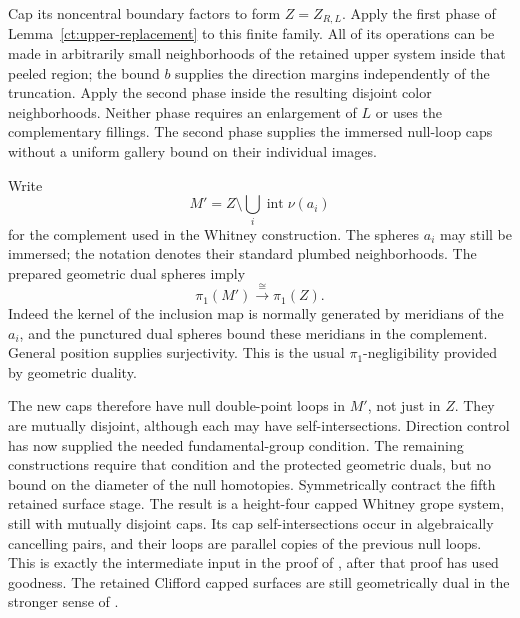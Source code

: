 Cap its noncentral boundary factors to form $Z=Z_{R,L}$. Apply the
first phase of
Lemma~\ref{ct:upper-replacement} to this finite family. All of its
operations can be made in arbitrarily small neighborhoods of the
retained upper system inside that peeled region; the bound $b$ supplies
the direction
margins independently of the truncation. Apply the second phase inside
the resulting disjoint color neighborhoods. Neither phase requires
an enlargement of $L$ or uses the complementary fillings. The second
phase supplies the immersed null-loop caps without a uniform gallery
bound on their individual images.

Write
\[
                  M'=Z\setminus\bigcup_i\operatorname{int}\nu(a_i)
\]
for the complement used in the Whitney construction.  The spheres
$a_i$ may still be immersed; the notation denotes their standard
plumbed neighborhoods.  The prepared geometric dual spheres imply
\begin{equation}\label{ct:complement-group}
                   \pi_1(M')\xrightarrow{\ \cong\ }\pi_1(Z).
\end{equation}
Indeed the kernel of the inclusion map is normally generated by
meridians of the $a_i$, and the punctured dual spheres bound these
meridians in the complement.  General position supplies surjectivity.
This is the usual $\pi_1$-negligibility provided by geometric duality.

The new caps therefore have null double-point loops in $M'$, not
just in $Z$.  They are mutually disjoint, although each may have
self-intersections. Direction control has now supplied the needed
fundamental-group condition. The remaining constructions require that
condition and the protected geometric duals, but no bound on the
diameter of the null homotopies. Symmetrically contract the fifth retained
surface stage.  The result is a height-four capped Whitney grope
system, still with mutually disjoint caps.  Its cap
self-intersections occur in algebraically cancelling pairs, and
their loops are parallel copies of the previous null loops.  This
is exactly the intermediate input in the proof of
\cite[Lemma~4.2]{PRT}, after that proof has used goodness.  The
retained Clifford capped surfaces are still geometrically dual in
the stronger sense of \cite[Definition~3.1]{PRT}.

